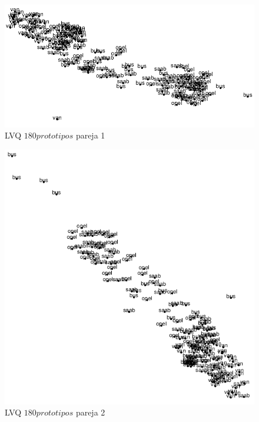\documentclass[11pt,spanish,listoffigures,listoftables]{workluis}
\begin{document}
\begin{figure}[H]
\centering
\includegraphics[scale=0.5]{lvq180p1}
\caption{LVQ $180 prototipos$ pareja 1}
\end{figure} 

\begin{figure}[H]
\centering
\includegraphics[scale=0.5]{lvq180p2}
\caption{LVQ $180 prototipos$ pareja 2}
\end{figure} 
\end{document}
